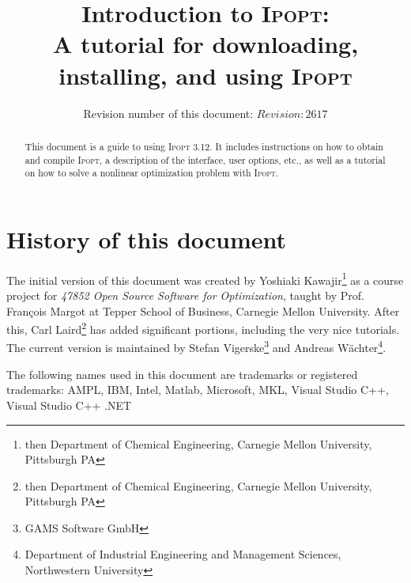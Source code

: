 \documentclass[10pt]{article}
\newcommand{\Ipopt}{\textsc{Ipopt}\xspace}
\begin{document}
\title{Introduction to \Ipopt:\\
A tutorial for downloading, installing, and using \Ipopt}

\author{Revision number of this document: $Revision: 2617 $}

\maketitle

\begin{abstract}
  This document is a guide to using \Ipopt 3.12.  It includes
  instructions on how to obtain and compile \Ipopt, a description of
  the interface, user options, etc., as well as a tutorial on how to
  solve a nonlinear optimization problem with \Ipopt.
\end{abstract}

\section*{History of this document}
The initial version of this document was created by Yoshiaki
Kawajir\footnote{then Department of Chemical Engineering, Carnegie Mellon
  University, Pittsburgh PA} as a course project for \textit{47852
  Open Source Software for Optimization}, taught by Prof. Fran\c{c}ois
Margot at Tepper School of Business, Carnegie Mellon University.
After this, Carl Laird\footnote{then Department of Chemical
  Engineering, Carnegie Mellon University, Pittsburgh PA} has added
significant portions, including the very nice tutorials.  The current
version is maintained by Stefan Vigerske\footnote{GAMS Software GmbH} and
  Andreas W\"achter\footnote{Department of Industrial Engineering and
  Management Sciences, Northwestern University}.

\tableofcontents

\vspace{\baselineskip}
\begin{small}
\noindent
The following names used in this document are trademarks or registered
trademarks: AMPL, IBM, Intel, Matlab, Microsoft, MKL, Visual Studio C++,
Visual Studio C++ .NET
\end{small}
\end{document}
